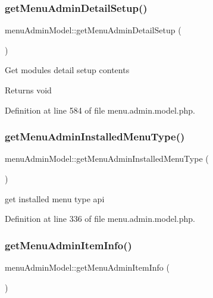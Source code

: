 \subsubsection{\texorpdfstring{get\+Menu\+Admin\+Detail\+Setup()}{getMenuAdminDetailSetup()}}
{\footnotesize\ttfamily menu\+Admin\+Model\+::get\+Menu\+Admin\+Detail\+Setup (\begin{DoxyParamCaption}{ }\end{DoxyParamCaption})}

Get module\textquotesingle{}s detail setup contents \begin{DoxyReturn}{Returns}
void 
\end{DoxyReturn}


Definition at line 584 of file menu.\+admin.\+model.\+php.

\mbox{\label{classmenuAdminModel_a1fd1ae309603a0fc0b58589d2cc0d025}} 
\subsubsection{\texorpdfstring{get\+Menu\+Admin\+Installed\+Menu\+Type()}{getMenuAdminInstalledMenuType()}}
{\footnotesize\ttfamily menu\+Admin\+Model\+::get\+Menu\+Admin\+Installed\+Menu\+Type (\begin{DoxyParamCaption}{ }\end{DoxyParamCaption})}

get installed menu type api 

Definition at line 336 of file menu.\+admin.\+model.\+php.

\mbox{\label{classmenuAdminModel_a12a02d8f3441f1454fe22e5b8d927de5}} 
\subsubsection{\texorpdfstring{get\+Menu\+Admin\+Item\+Info()}{getMenuAdminItemInfo()}}
{\footnotesize\ttfamily menu\+Admin\+Model\+::get\+Menu\+Admin\+Item\+Info (\begin{DoxyParamCaption}{ }\end{DoxyParamCaption})}


